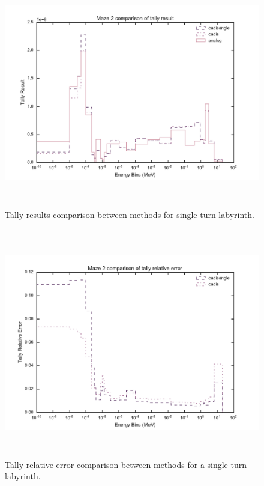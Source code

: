 \begin{figure}[h!]
  \centering
  \includegraphics[height=10cm]{./chapters/characterization_probs/figures/char/maze2/maze_2_tally_result_compare.pdf}
  \caption[Tally results comparison between methods for single turn labyrinth.]
  {Tally results comparison between methods for single turn labyrinth.}
  \label{fig:maze2result}
\end{figure}

\begin{figure}[h!]
  \centering
  \includegraphics[height=10cm]{./chapters/characterization_probs/figures/char/maze2/maze_2_tally_error_compare.pdf}
  \caption[Tally relative error comparison between methods for single turn
  labyrinth]{Tally relative error comparison between methods for a single turn
  labyrinth.}
  \label{fig:maze2error}
\end{figure}

